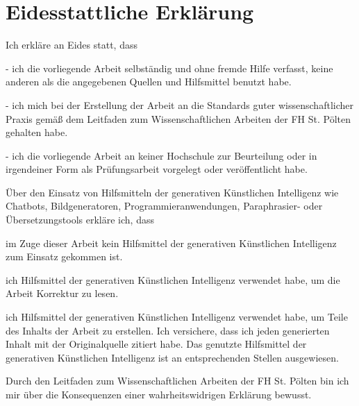 \chapter*{Eidesstattliche Erklärung}
\label{ch:erklaerung}

\begin{flushleft}
Ich erkläre an Eides statt, dass
\end{flushleft}

\begin{flushleft}
- ich die vorliegende Arbeit selbständig und ohne fremde Hilfe verfasst, keine anderen als die angegebenen Quellen und Hilfsmittel benutzt habe.
\end{flushleft}

\begin{flushleft}
- ich mich bei der Erstellung der Arbeit an die Standards guter wissenschaftlicher Praxis gemäß dem Leitfaden zum Wissenschaftlichen Arbeiten der FH St. Pölten gehalten habe.
\end{flushleft}

\begin{flushleft}
- ich die vorliegende Arbeit an keiner Hochschule zur Beurteilung oder in irgendeiner Form als Prüfungsarbeit vorgelegt oder veröffentlicht habe. 
\end{flushleft}

Über den Einsatz von Hilfsmitteln der generativen Künstlichen Intelligenz wie Chatbots, Bildgeneratoren, Programmieranwendungen, Paraphrasier- oder Übersetzungstools erkläre ich, dass


\begin{todolist}
    \item[\done] im Zuge dieser Arbeit kein Hilfsmittel der generativen Künstlichen Intelligenz zum Einsatz gekommen ist. 
    \item ich Hilfsmittel der generativen Künstlichen Intelligenz verwendet habe, um die Arbeit Korrektur zu lesen.
    \item ich Hilfsmittel der generativen Künstlichen Intelligenz verwendet habe, um Teile des Inhalts der Arbeit zu erstellen. Ich versichere, dass ich jeden generierten Inhalt mit der Originalquelle zitiert habe. Das genutzte Hilfsmittel der generativen Künstlichen Intelligenz ist an entsprechenden Stellen ausgewiesen.
\end{todolist}

Durch den Leitfaden zum Wissenschaftlichen Arbeiten der FH St. Pölten bin ich mir über die Konsequenzen einer wahrheitswidrigen Erklärung bewusst.

\vspace{1.5cm}



